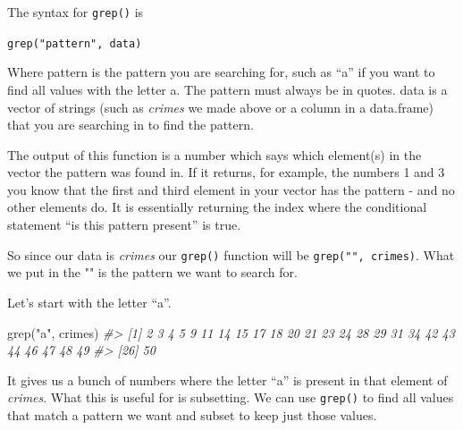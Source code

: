 \documentclass[
  12pt,
]{book}
\newenvironment{Shaded}{\begin{snugshade}}{\end{snugshade}}
\newcommand{\CommentTok}[1]{\textcolor[rgb]{0.37,0.37,0.37}{\textit{#1}}}
\newcommand{\FunctionTok}[1]{\textcolor[rgb]{0,0,0}{#1}}
\newcommand{\NormalTok}[1]{#1}
\newcommand{\StringTok}[1]{\textcolor[rgb]{0.5,0.5,0.5}{#1}}
\begin{document}
The syntax for \texttt{grep()} is

\texttt{grep("pattern",\ data)}

Where pattern is the pattern you are searching for, such as ``a'' if you want to find all values with the letter a. The pattern must always be in quotes. data is a vector of strings (such as \emph{crimes} we made above or a column in a data.frame) that you are searching in to find the pattern.

The output of this function is a number which says which element(s) in the vector the pattern was found in. If it returns, for example, the numbers 1 and 3 you know that the first and third element in your vector has the pattern - and no other elements do. It is essentially returning the index where the conditional statement ``is this pattern present'' is true.

So since our data is \emph{crimes} our \texttt{grep()} function will be \texttt{grep("",\ crimes)}. What we put in the "" is the pattern we want to search for.

Let's start with the letter ``a''.

\begin{Shaded}
\begin{Highlighting}[]
\FunctionTok{grep}\NormalTok{(}\StringTok{"a"}\NormalTok{, crimes)}
\CommentTok{\#\textgreater{}  [1]  2  3  4  5  9 11 14 15 17 18 20 21 23 24 28 29 31 34 42 43 44 46 47 48 49}
\CommentTok{\#\textgreater{} [26] 50}
\end{Highlighting}
\end{Shaded}

It gives us a bunch of numbers where the letter ``a'' is present in that element of \emph{crimes}. What this is useful for is subsetting. We can use \texttt{grep()} to find all values that match a pattern we want and subset to keep just those values.
\end{document}
